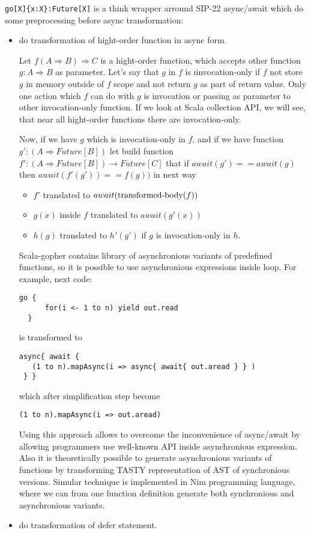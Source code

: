 \documentclass[12pt]{article}
\newcommand{\To}{\Rightarrow}
\begin{document}
 \verb|go[X]{x:X}:Future[X]| is a think wrapper arround  SIP-22 async/await which do some preprocessing before async transformation:
\begin{itemize}
 \item do transformation of hight-order function in async form.


  Let $f(A \To B)\To C$ is a hight-order function, which accepts other function 
   $g:A \To B$ as parameter. 
  Let's say that $g$ in $f$ is {\i invocation-only } if $f$ not store $g$ in memory outside of $f$ scope and not return $g$ as part of return value. Only one action which $f$ can do with $g$ is invocation or passing as parameter to other invocation-only function.  If we look at Scala collection API, we will see, that near all hight-order functions there are invocation-only.

  Now, if we have $g$ which is invocation-only in $f$, and if we have function $g' : (A \To Future[B])$ let build function $f':(A\To Future[B])\to Future[C]$ that if $await(g')==await(g)$ then $await(f'(g'))==f(g))$ in next way
  \begin{itemize}
    \item $f'$ translated to $await(\makebox{transformed-body}(f))$
    \item $g(x)$ inside $f$ translated to $await(g'(x))$
    \item $h(g)$ translated to $h'(g')$ if $g$ is invocation-only in $h$.
  \end{itemize}

  Scala-gopher contains library of asynchronious variants of predefined functions, so it is possible to use asynchronious expressions inside loop. For example, next code:

\begin{Verbatim}[fontsize=\small]
  go { 
      for(i <- 1 to n) yield out.read
  }
\end{Verbatim}

  is transformed to

\begin{Verbatim}[fontsize=\small]
 async{ await {
   (1 to n).mapAsync(i => async{ await{ out.aread } } )
 } }
\end{Verbatim}

  which after simplification step become

\begin{Verbatim}[fontsize=\small]
   (1 to n).mapAsync(i => out.aread)
\end{Verbatim}

 Using this approach allows to overcome the inconvenience of async/await by allowing programmers use well-known API inside asynchronious expression. Also it is theoretically possible to generate asynchronious variants of functions by transforming TASTY representation of AST of synchronious versions. Simular technique is implemented in Nim \cite{Nim} programming language, where we can from one function definition generate both synchronious and asynchronious variants. 
  
 \item do transformation of defer statement.

\end{itemize}
\end{document}
